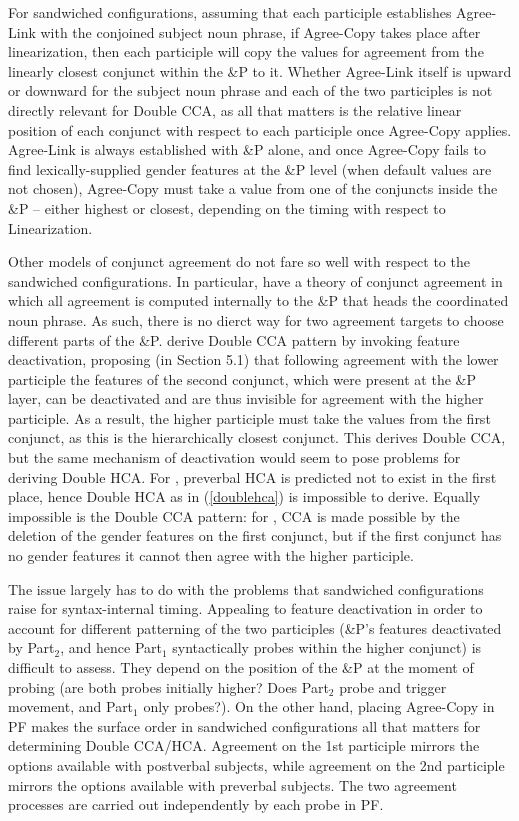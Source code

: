 \documentclass[output=paper
,modfonts
,nonflat]{langsci/langscibook}
\begin{document}
For sandwiched configurations, assuming that each participle establishes Agree-Link with the conjoined subject noun phrase, if Agree-Copy takes place after linearization, then each participle will copy the values for agreement from the linearly closest conjunct within the \&P to it. Whether Agree-Link itself is upward or downward for the subject noun phrase and each of the two participles is not directly relevant for Double CCA, as all that matters is the relative linear position of each conjunct with respect to each participle once Agree-Copy applies. Agree-Link is always established with \&P alone, and once Agree-Copy fails to find lexically-supplied gender features at the \&P level (when default values are not chosen), Agree-Copy must take a value from one of the conjuncts inside the \&P -- either highest or closest, depending on the timing with respect to Linearization.

Other models of conjunct agreement do not fare so well with respect to the sandwiched configurations. In particular, \citet{puskarmurphy:17} have a theory of conjunct agreement in which all agreement is computed internally to the \&P that heads the coordinated noun phrase. As such, there is no dierct way for two agreement targets to choose different parts of the \&P. 
\citet{puskarmurphy:17} derive Double CCA pattern by invoking feature deactivation, proposing (in Section 5.1) that following agreement with the lower participle the features of the second conjunct, which were present at the \&P layer, can be deactivated and are thus invisible for agreement with the higher participle. As a result, the higher participle must take the values from the first conjunct, as this is the hierarchically closest conjunct. This derives Double CCA, but the same mechanism of deactivation would seem to pose problems for deriving Double HCA. For \citet{boskovic:09}, preverbal HCA is predicted not to exist in the first place, hence Double HCA as in (\ref{doublehca}) is impossible to derive. Equally impossible is the Double CCA pattern: for \cite{boskovic:09}, CCA is made possible by the deletion of the gender features on the first conjunct, but if the first conjunct has no gender features it cannot then agree with the higher participle.

The issue largely has to do with the problems that sandwiched configurations raise for syntax-internal timing. Appealing to feature deactivation in order to account for different patterning of the two participles (\&P’s features deactivated by Part$_2$, and hence Part$_1$ syntactically probes within the higher conjunct) is difficult to assess. They depend on the position of the \&P at the moment of probing (are both probes initially higher? Does Part$_2$ probe and trigger movement, and Part$_1$ only probes?). On the other hand, placing Agree-Copy in PF makes the surface order in sandwiched configurations all that matters for determining Double CCA/HCA. Agreement on the 1st participle mirrors the options available with postverbal subjects, while agreement on the 2nd participle mirrors the options available with preverbal subjects. The two agreement processes are carried out independently by each probe in PF.
\end{document}
